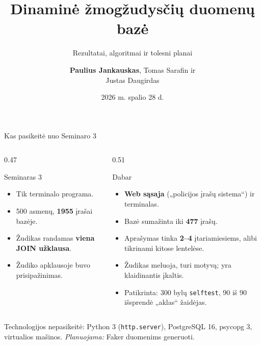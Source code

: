 \documentclass[hyperref={breaklinks=true},fleqn,mathserif]{beamer}
\title[Dinaminė žmogžudysčių duomenų bazė]{Dinaminė žmogžudysčių duomenų bazė}
\subtitle{Rezultatai, algoritmai ir tolesni planai}
\author[\textit{et al.}]{\textbf{Paulius Jankauskas}, Tomas Sarafin ir \\ Justas Daugirdas}
\institute{Vilniaus universitetas \\ Matematikos ir informatikos fakultetas }
\date{2026 m. spalio 28 d.}
\begin{document}
\frame[plain]{\titlepage}


\begin{frame}{Kas pasikeitė nuo Seminaro 3}

\begin{columns}[T]
\begin{column}{0.47\textwidth}
\begin{alertblock}{Seminaras 3}
\footnotesize
\begin{itemize}
    \setlength{\itemsep}{2pt}
    \item Tik terminalo programa.
    \item 500 asmenų, \textbf{1955} įrašai bazėje.
    \item Žudikas randamas \textbf{viena JOIN užklausa}.
    \item Žudiko apklausoje buvo prisipažinimas.
\end{itemize}
\end{alertblock}
\end{column}

\begin{column}{0.51\textwidth}
\begin{exampleblock}{Dabar}
\footnotesize
\begin{itemize}
    \setlength{\itemsep}{2pt}
    \item \textbf{Web sąsaja} („policijos įrašų sistema“) ir terminalas.
    \item Bazė sumažinta iki \textbf{477} įrašų.
    \item Aprašymas tinka \textbf{2--4} įtariamiesiems, alibi tikrinami kitose lentelėse.
    \item Žudikas meluoja, turi motyvą; yra klaidinantis įkaltis.
    \item Patikrinta: 300 bylų \texttt{selftest}, 90 iš 90 išsprendė „aklas“ žaidėjas.
\end{itemize}
\end{exampleblock}
\end{column}
\end{columns}

\vspace{3mm}
{\footnotesize Technologijos nepasikeitė: Python 3 (\texttt{http.server}), PostgreSQL 16, psycopg 3,
virtualios mašinos. \textit{Planuojama:} Faker duomenims generuoti.}

\end{frame}
\end{document}
